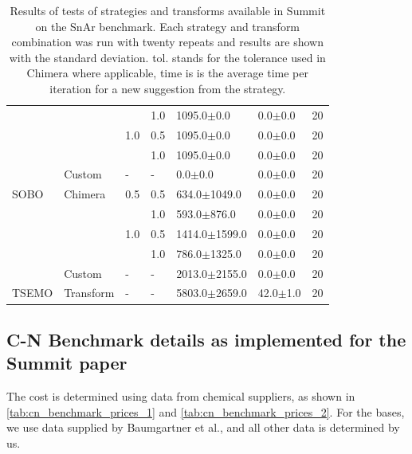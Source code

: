 \begin{table}[]
\begin{tabular}{lllllll}
              &           &     & 1.0 &       1095.0$\pm$0.0 &        0.0$\pm$0.0 &       20 \\
              &           & 1.0 & 0.5 &       1095.0$\pm$0.0 &        0.0$\pm$0.0 &       20 \\
              &           &     & 1.0 &       1095.0$\pm$0.0 &        0.0$\pm$0.0 &       20 \\
              & Custom & - & - &          0.0$\pm$0.0 &        0.0$\pm$0.0 &       20 \\
        SOBO & Chimera & 0.5 & 0.5 &     634.0$\pm$1049.0 &        0.0$\pm$0.0 &       20 \\
              &           &     & 1.0 &      593.0$\pm$876.0 &        0.0$\pm$0.0 &       20 \\
              &           & 1.0 & 0.5 &    1414.0$\pm$1599.0 &        0.0$\pm$0.0 &       20 \\
              &           &     & 1.0 &     786.0$\pm$1325.0 &        0.0$\pm$0.0 &       20 \\
              & Custom & - & - &    2013.0$\pm$2155.0 &        0.0$\pm$0.0 &       20 \\
        TSEMO & Transform & - & - &    5803.0$\pm$2659.0 &       42.0$\pm$1.0 &       20 \\
    \end{tabular}
    \caption{Results of tests of strategies and transforms available in Summit on the SnAr benchmark. Each strategy and transform combination was run with twenty repeats and results are shown with the standard deviation. tol. stands for the tolerance used in Chimera where applicable, time is is the average time per iteration for a new suggestion from the strategy.}
    \label{tab:snar_benchmark_results}
\end{table}


\subsection{C-N Benchmark details as implemented for the Summit paper}


 The cost is determined using data from chemical suppliers, as shown in \ref{tab:cn_benchmark_prices_1} and \ref{tab:cn_benchmark_prices_2}. For the bases, we use data supplied by Baumgartner et al.\cite{Baumgartner2019}, and all other data is determined by us.
 
